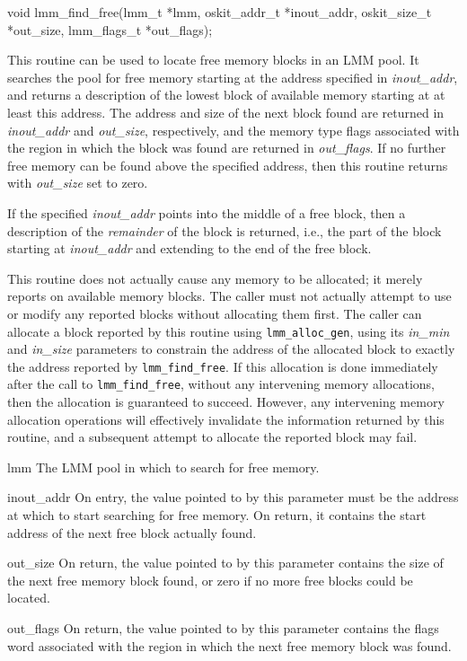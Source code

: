 \begin{apisyn}

	\funcproto void lmm_find_free(lmm_t *lmm,
		\inoutparam oskit_addr_t *inout_addr,
		\outparam oskit_size_t *out_size,
		\outparam lmm_flags_t *out_flags);
\end{apisyn}
\begin{apidesc}
	This routine can be used to locate free memory blocks in an LMM pool.
	It searches the pool for free memory
	starting at the address specified in {\tt *}\emph{inout_addr},
	and returns a description of the lowest block of available memory
	starting at at least this address.
	The address and size of the next block found
	are returned in {\tt *}\emph{inout_addr} and {\tt *}\emph{out_size},
	respectively,
	and the memory type flags associated with
	the region in which the block was found
	are returned in {\tt *}\emph{out_flags}.
	If no further free memory can be found above the specified address,
	then this routine returns with {\tt *}\emph{out_size} set to zero.

	If the specified {\tt *}\emph{inout_addr}
	points into the middle of a free block,
	then a description of the \emph{remainder} of the block is returned,
	i.e., the part of the block starting at {\tt *}\emph{inout_addr}
	and extending to the end of the free block.

	This routine does not actually cause any memory to be allocated;
	it merely reports on available memory blocks.
	The caller must not actually attempt
	to use or modify any reported blocks
	without allocating them first.
	The caller can allocate a block reported by this routine
	using {\tt lmm_alloc_gen},
	using its \emph{in_min} and \emph{in_size} parameters
	to constrain the address of the allocated block
	to exactly the address reported by {\tt lmm_find_free}.
	If this allocation is done
	immediately after the call to {\tt lmm_find_free},
	without any intervening memory allocations,
	then the allocation is guaranteed to succeed.
	However, any intervening memory allocation operations
	will effectively invalidate the information returned by this routine,
	and a subsequent attempt to allocate the reported block may fail.
\end{apidesc}
\begin{apiparm}
	\item[lmm]
		The LMM pool in which to search for free memory.
	\item[inout_addr]
		On entry, the value pointed to by this parameter
		must be the address at which to start searching for free memory.
		On return, it contains the start address
		of the next free block actually found.
	\item[out_size]
		On return, the value pointed to by this parameter
		contains the size of the next free memory block found,
		or zero if no more free blocks could be located.
	\item[out_flags]
		On return, the value pointed to by this parameter
		contains the flags word associated with the region
		in which the next free memory block was found.
\end{apiparm}

